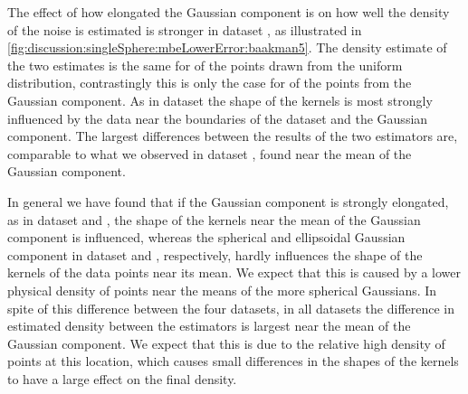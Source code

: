 
		The effect of how elongated the Gaussian component is on how well the density of the noise is estimated is stronger in dataset \baakmanFive, as illustrated in \cref{fig:discussion:singleSphere:mbeLowerError:baakman5}. The density estimate of the two estimates is the same for  of the points drawn from the uniform distribution, contrastingly this is only the case for  of the points from the Gaussian component. 
		As in dataset \baakmanFour the shape of the kernels is most strongly influenced by the data near the boundaries of the dataset and the Gaussian component.
		The largest differences between the results of the two estimators are, comparable to what we observed in dataset \baakmanFour, found near the mean of the Gaussian component. 

In general we have found that if the Gaussian component is strongly elongated, as in dataset \baakmanFour and \baakmanFive, the shape of the kernels near the mean of the Gaussian component is influenced, whereas the spherical and ellipsoidal Gaussian component in dataset \ferdosiOne and \baakmanOne, respectively, hardly influences the shape of the kernels of the data points near its mean. We expect that this is caused by a lower physical density of points near the means of the more spherical Gaussians. 
In spite of this difference between the four datasets, in all datasets the difference in estimated density between the estimators is largest near the mean of the Gaussian component. We expect that this is due to the relative high density of points at this location, which causes small differences in the shapes of the kernels to have a large effect on the final density. 